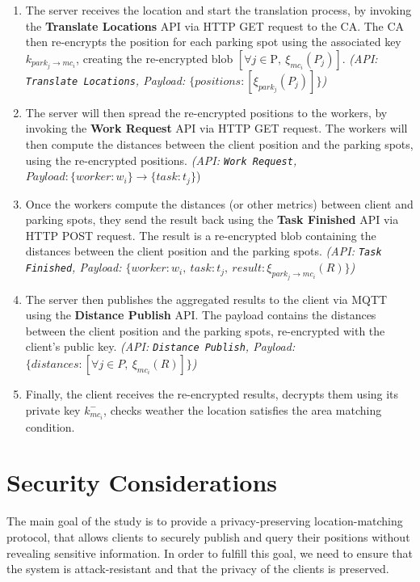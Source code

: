 \begin{enumerate}
    \item The server receives the location and start the translation process, by invoking the \textbf{Translate Locations} API via HTTP GET request to the CA. The CA then re-encrypts the position for each parking spot using the associated key $k_{park_j \to mc_i}$, creating the re-encrypted blob $[\forall j \in \text{P},\ \xi_{mc_i}(P_j)]$. \emph{(API: \texttt{Translate Locations}, Payload: $\{positions: [\xi_{park_j}(P_j)]\}$)}
    \item The server will then spread the re-encrypted positions to the workers, by invoking the \textbf{Work Request} API via HTTP GET request. The workers will then compute the distances between the client position and the parking spots, using the re-encrypted positions. \emph{(API: \texttt{Work Request}, $Payload: \{ worker: w_i \} \to \{task: t_j \} $})
    \item Once the workers compute the distances (or other metrics) between client and parking spots, they send the result back using the \textbf{Task Finished} API via HTTP POST request. The result is a re-encrypted blob containing the distances between the client position and the parking spots. \emph{(API: \texttt{Task Finished}, Payload: $\{worker: w_i,\ task: t_j,\ result: \xi_{park_j \to mc_i}(R)\}$)}
    \item The server then publishes the aggregated results to the client via MQTT using the \textbf{Distance Publish} API. The payload contains the distances between the client position and the parking spots, re-encrypted with the client's public key. \emph{(API: \texttt{Distance Publish}, Payload: $\{distances: [\forall j \in P,\ \xi_{mc_i}(R)]\}$)}
    \item Finally, the client receives the re-encrypted results, decrypts them using its private key $k_{mc_i}^-$, checks weather the location satisfies the area matching condition.
\end{enumerate}

\section{Security Considerations}

The main goal of the study is to provide a privacy-preserving location-matching protocol, that allows clients to securely publish and query their positions without revealing sensitive information. In order to fulfill this goal, we need to ensure that the system is attack-resistant and that the privacy of the clients is preserved.

